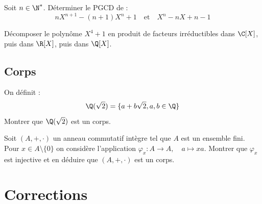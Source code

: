 \begin{exercice}
Soit $n\in\N^{*}$. Déterminer le PGCD de :
\[nX^{n+1}-(n+1)X^{n}+1 \quad \text{et} \quad X^{n}-nX+n-1\]
\end{exercice}

\begin{exercice}
Décomposer le polynôme $X^{4}+1$ en produit de facteurs irréductibles dans $\C[X]$, puis dans $\R[X]$, puis dans $\Q[X]$. 
\end{exercice}

\subsection{Corps}

\begin{exercice}
On définit :
\[\Q(\sqrt{2})=\{a+b\sqrt{2},a,b\in\Q\}\]
Montrer que $\Q(\sqrt{2})$ est un corps. 
\end{exercice}

\begin{exercice}
Soit $(A,+,\cdot)$ un anneau commutatif intègre tel que $A$ est un ensemble fini. 
Pour $x\in A\setminus\{0\}$ on considère l'application $\varphi_{x} : A\rightarrow A, \quad a\mapsto xa$. 
Montrer que $\varphi_{x}$ est injective et en déduire que $(A,+,\cdot)$ est un corps. 
\end{exercice}

\newpage
\section{Corrections}


